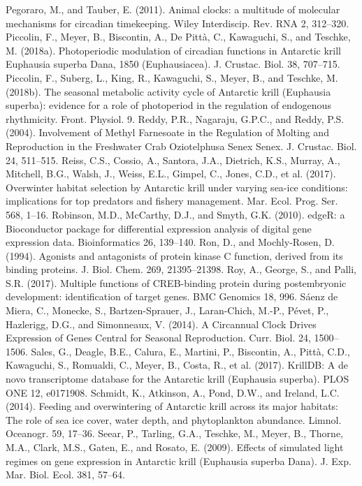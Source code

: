 Pegoraro, M., and Tauber, E. (2011). Animal clocks: a multitude of molecular mechanisms for circadian timekeeping. Wiley Interdiscip. Rev. RNA 2, 312–320.
Piccolin, F., Meyer, B., Biscontin, A., De Pittà, C., Kawaguchi, S., and Teschke, M. (2018a). Photoperiodic modulation of circadian functions in Antarctic krill Euphausia superba Dana, 1850 (Euphausiacea). J. Crustac. Biol. 38, 707–715.
Piccolin, F., Suberg, L., King, R., Kawaguchi, S., Meyer, B., and Teschke, M. (2018b). The seasonal metabolic activity cycle of Antarctic krill (Euphausia superba): evidence for a role of photoperiod in the regulation of endogenous rhythmicity. Front. Physiol. 9.
Reddy, P.R., Nagaraju, G.P.C., and Reddy, P.S. (2004). Involvement of Methyl Farnesoate in the Regulation of Molting and Reproduction in the Freshwater Crab Oziotelphusa Senex Senex. J. Crustac. Biol. 24, 511–515.
Reiss, C.S., Cossio, A., Santora, J.A., Dietrich, K.S., Murray, A., Mitchell, B.G., Walsh, J., Weiss, E.L., Gimpel, C., Jones, C.D., et al. (2017). Overwinter habitat selection by Antarctic krill under varying sea-ice conditions: implications for top predators and fishery management. Mar. Ecol. Prog. Ser. 568, 1–16.
Robinson, M.D., McCarthy, D.J., and Smyth, G.K. (2010). edgeR: a Bioconductor package for differential expression analysis of digital gene expression data. Bioinformatics 26, 139–140.
Ron, D., and Mochly-Rosen, D. (1994). Agonists and antagonists of protein kinase C function, derived from its binding proteins. J. Biol. Chem. 269, 21395–21398.
Roy, A., George, S., and Palli, S.R. (2017). Multiple functions of CREB-binding protein during postembryonic development: identification of target genes. BMC Genomics 18, 996.
Sáenz de Miera, C., Monecke, S., Bartzen-Sprauer, J., Laran-Chich, M.-P., Pévet, P., Hazlerigg, D.G., and Simonneaux, V. (2014). A Circannual Clock Drives Expression of Genes Central for Seasonal Reproduction. Curr. Biol. 24, 1500–1506.
Sales, G., Deagle, B.E., Calura, E., Martini, P., Biscontin, A., Pittà, C.D., Kawaguchi, S., Romualdi, C., Meyer, B., Costa, R., et al. (2017). KrillDB: A de novo transcriptome database for the Antarctic krill (Euphausia superba). PLOS ONE 12, e0171908.
Schmidt, K., Atkinson, A., Pond, D.W., and Ireland, L.C. (2014). Feeding and overwintering of Antarctic krill across its major habitats: The role of sea ice cover, water depth, and phytoplankton abundance. Limnol. Oceanogr. 59, 17–36.
Seear, P., Tarling, G.A., Teschke, M., Meyer, B., Thorne, M.A., Clark, M.S., Gaten, E., and Rosato, E. (2009). Effects of simulated light regimes on gene expression in Antarctic krill (Euphausia superba Dana). J. Exp. Mar. Biol. Ecol. 381, 57–64.
